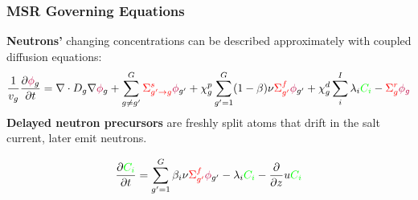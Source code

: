 \begin{frame}
  \frametitle{MSR Governing Equations}
      \textbf{Neutrons'} changing concentrations can be described approximately with coupled diffusion equations:
\begin{equation}
				\frac{1}{v_g}\frac{\partial \textcolor{purple}{\phi}_g}{\partial t}   = \nabla \cdot D_g
				\nabla \textcolor{purple}{\phi}_g +
				\sum_{g \ne g'}^G
                \textcolor{red}{\Sigma_{g'\rightarrow g}^s} \textcolor{purple}{\phi}_{g'} + \chi_g^p \sum_{g' = 1}^G (1 -
                \beta) \nu \textcolor{red}{\Sigma_{g'}^f} \textcolor{purple}{\phi}_{g'} + \chi_g^d \sum_i^I \lambda_i \textcolor{green}{C_i} - \textcolor{red}{\Sigma_g^r} \textcolor{purple}{\phi_g}
		\label{eq:neutrons}
\end{equation}
    \textbf{Delayed neutron precursors} are freshly split atoms that drift in the salt current, later emit neutrons.

    \begin{equation}
        \frac{\partial \textcolor{green}{C_i}}{\partial t} = \sum_{g'= 1}^G \beta_i \nu
        \textcolor{red}{\Sigma_{g'}^f} \textcolor{purple}{\phi}_{g'} - \lambda_i \textcolor{green}{C_i} - \frac{\partial}{\partial z} u
        \textcolor{green}{C_i} \label{eq:precursors}
    \end{equation}                                                                 				%


\end{frame}
